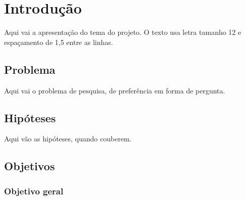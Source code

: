 \documentclass[12pt,a4paper,oneside]{article}
\begin{document}
\imprimircapa

\imprimirfolhaderosto

\listadequadros

\begin{listadesiglas}
\end{listadesiglas}

\sumario

\textual

\section{Introdução}

Aqui vai a apresentação do tema do projeto. O texto usa letra tamanho 12 e espaçamento de 1,5 entre as linhas.

\subsection{Problema}

Aqui vai o problema de pesquisa, de preferência em forma de pergunta.

\subsection{Hipóteses}

Aqui vão as hipóteses, quando couberem.

\subsection{Objetivos}

\subsubsection{Objetivo geral}
\end{document}
